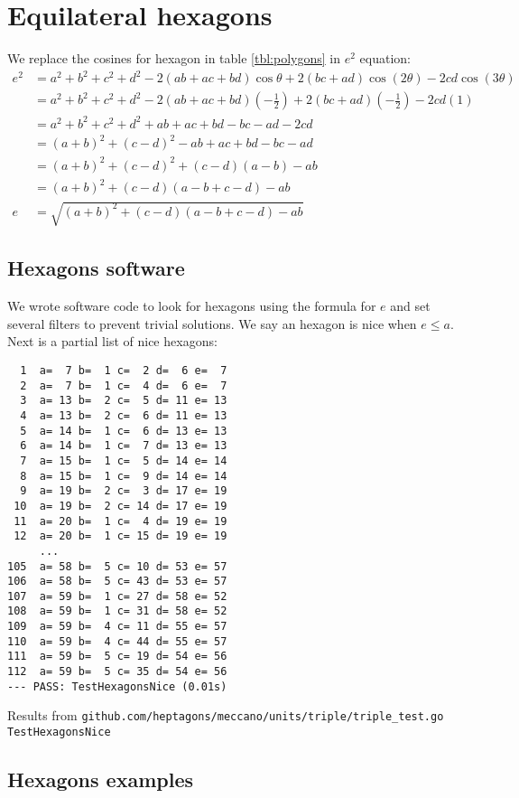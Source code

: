 \documentclass[11pt]{article}
\begin{document}
\section{Equilateral hexagons}

We replace the cosines for hexagon in table \ref{tbl:polygons} in $e^2$ equation:
\begin{align}
e^2 &= a^2 +b^2 +c^2 +d^2 -2(ab+ac+bd)\cos\theta +2(bc+ad)\cos(2\theta) -2cd\cos(3\theta) \nonumber\\
 &= a^2 +b^2 +c^2 +d^2 -2(ab+ac+bd)\left(-\frac{1}{2}\right) +2(bc+ad)\left(-\frac{1}{2}\right) -2cd(1) \nonumber\\
 &= a^2 +b^2 +c^2 +d^2 +ab+ac+bd -bc-ad-2cd \nonumber\\
 &= (a+b)^2 +(c-d)^2 -ab+ac+bd-bc-ad\nonumber\\
 &= (a+b)^2 +(c-d)^2 +(c-d)(a-b) -ab \nonumber\\
 &= (a+b)^2 +(c-d)(a-b+c-d) -ab \nonumber\\
e &= \sqrt{(a+b)^2 +(c-d)(a-b+c-d) -ab}
\end{align} 

\subsection{Hexagons software}
We wrote software code to look for hexagons using the formula for $e$ and set several
filters to prevent trivial solutions. We say an hexagon is nice when $e \leq a$.
Next is a partial list of nice hexagons:
\begin{lstlisting}
  1  a=  7 b=  1 c=  2 d=  6 e=  7
  2  a=  7 b=  1 c=  4 d=  6 e=  7
  3  a= 13 b=  2 c=  5 d= 11 e= 13
  4  a= 13 b=  2 c=  6 d= 11 e= 13
  5  a= 14 b=  1 c=  6 d= 13 e= 13
  6  a= 14 b=  1 c=  7 d= 13 e= 13
  7  a= 15 b=  1 c=  5 d= 14 e= 14
  8  a= 15 b=  1 c=  9 d= 14 e= 14
  9  a= 19 b=  2 c=  3 d= 17 e= 19
 10  a= 19 b=  2 c= 14 d= 17 e= 19
 11  a= 20 b=  1 c=  4 d= 19 e= 19
 12  a= 20 b=  1 c= 15 d= 19 e= 19
     ...
105  a= 58 b=  5 c= 10 d= 53 e= 57
106  a= 58 b=  5 c= 43 d= 53 e= 57
107  a= 59 b=  1 c= 27 d= 58 e= 52
108  a= 59 b=  1 c= 31 d= 58 e= 52
109  a= 59 b=  4 c= 11 d= 55 e= 57
110  a= 59 b=  4 c= 44 d= 55 e= 57
111  a= 59 b=  5 c= 19 d= 54 e= 56
112  a= 59 b=  5 c= 35 d= 54 e= 56
--- PASS: TestHexagonsNice (0.01s)
\end{lstlisting}
Results from \texttt{github.com/heptagons/meccano/units/triple/triple\_test.go TestHexagonsNice}

\subsection{Hexagons examples}
\end{document}
